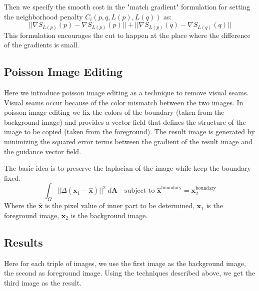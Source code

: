 Then we specify the smooth cost in the "match gradient" formulation for setting the neighborhood penalty $C_i(p, q, L(p), L(q))$ as:
$$||\nabla S_{L(p)}(p) - \nabla S_{L(p)}(p)|| + ||\nabla S_{L(p)}(q) - \nabla S_{L(q)}(q)||$$
This formulation encourages the cut to happen at the place where the difference of the gradients is small.


\subsection{Poisson Image Editing}
Here we introduce poisson image editing as a technique to remove visual seams. Visual seams occur because of the color mismatch between the two images. In poisson image editing we fix the colors of the boundary (taken from the background image) and provides a vector field that defines the structure of the image to be copied (taken from the foreground). The result image is generated by minimizing the squared error terms between the gradient of the result image and the guidance vector field.

The basic idea is to preserve the laplacian of the image while keep the boundary fixed.
$$\int_\Omega ||\Delta(\mathbf{x}_{1} - \hat{\mathbf{x}})||^2 \; d\mathbf{A} \quad \text{subject to } \hat{\mathbf{x}}^{\text{boundary}} = \mathbf{x}^{\text{boundary}}_2$$
Where the $\hat{\mathbf{x}}$ is the pixel value of inner part to be determined, $\mathbf{x}_1$ is the foreground image, $\mathbf{x}_2$ is the background image. 


\subsection{Results}
\begin{figure}[H]
    \centering
    \hfill
    \hfill
\end{figure}

\begin{figure}[H]
    \centering
    \hfill
    \hfill
\end{figure}

Here for each triple of images, we use the first image as the background image, the second as foreground image. Using the techniques described above, we get the third image as the result.

